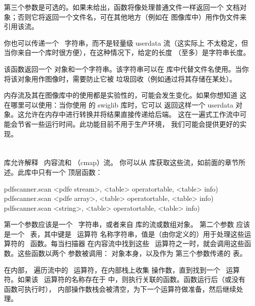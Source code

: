第三个参数是可选的。如果未给出，函数将像处理普通文件一样返回一个
 文档对象；否则它将返回一个文件名，可在其他地方（例如在
图像库中）用作伪文件来引用该流。

你也可以传递一个 \LUA\ 字符串，而不是轻量级 userdata 流（这实际上
不太稳定，但当你来自一个库时很方便），在这种情况下，给定的长度
（至多）是字符串长度。

该函数返回一个  对象和一个字符串。该字符串可以在
 库中代替文件名使用。当你将该对象用作图像时，需要防止它被
垃圾回收（例如通过将其存储在某处）。

内存流及其在图像库中的使用都是实验性的，可能会发生变化。如果你想知道
这在哪里可以使用：当你使用  的 swiglib 库时，它可以
返回这样一个 userdata 对象。这允许在内存中进行转换并将结果直接传递给后端。
这在一遍式工作流中可能会节省一些运行时间。此功能目前不用于生产环境，
我们可能会提供更好的实现。

\section{}



 库允许解释 \PDF\ 内容流和 （cmap）流。
你可以从  库获取这些流，如前面的章节所述。此库中只有一个
顶层函数：

\begin{typing}
pdfscanner.scan <pdfe stream>, <table> operatortable, <table> info)
pdfscanner.scan <pdfe array>, <table> operatortable, <table> info)
pdfscanner.scan <string>, <table> operatortable, <table> info)
\end{typing}

第一个参数应该是一个 \LUA\ 字符串，或者来自  库的流或数组对象。
第二个参数  应该是一个 \LUA\ 表，其中键是 \PDF\ 运算符
名称字符串，值是（由你定义的）用于处理这些运算符的 \LUA\ 函数。每当扫描器
在内容流中找到这些 \PDF\ 运算符之一时，就会调用这些函数。这些函数以两个
参数被调用： 对象本身，以及作为 
第三个参数传递的  表。

在内部， 遍历流中的 \PDF\ 运算符，在内部栈上收集
操作数，直到找到一个 \PDF\ 运算符。如果该 \PDF\ 运算符的名称存在于
 中，则执行关联的函数。函数运行后（或没有函数可执行时），
内部操作数栈会被清空，为下一个运算符做准备，然后继续处理。

